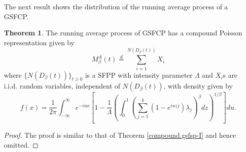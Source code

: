 \documentclass[11pt,oneside,reqno]{amsart}
\theoremstyle{definition}
\newtheorem{theorem}{\bf Theorem}[section]
\theoremstyle{remarkstyle}
\begin{document}
The next result shows the distribution of the running average process of a GSFCP.

\begin{theorem}\label{th.gcp}
The running average process of GSFCP has a compound Poisson representation given by
\begin{equation*}
M^A_{\beta}(t) \overset{d}{=}\sum_{i=1}^{N(D_{\beta}(t))}X_i
\end{equation*}
where $\{N(D_{\beta}(t))\}_{t\ge 0}$ is a SFPP with intensity parameter $\Lambda$ and $X_i$s are i.i.d. random variables, independent of $N(D_{\beta}(t))$, with density given by
\begin{equation*}
f(x) = \displaystyle\frac{1}{2\pi}\displaystyle\int_{-\infty}^{\infty}e^{-iux}[1-\frac{1}{\Lambda}(\int_{0}^{1}(\sum_{j=1}^{k}(1-e^{iuzj})\lambda_j)^\beta dz)^{1/\beta}]du.
\end{equation*}
\end{theorem} 

\begin{proof}
The proof is similar to that of Theorem \ref{compound.gsfsp-I} and hence omitted.
\end{proof}

\end{document}
